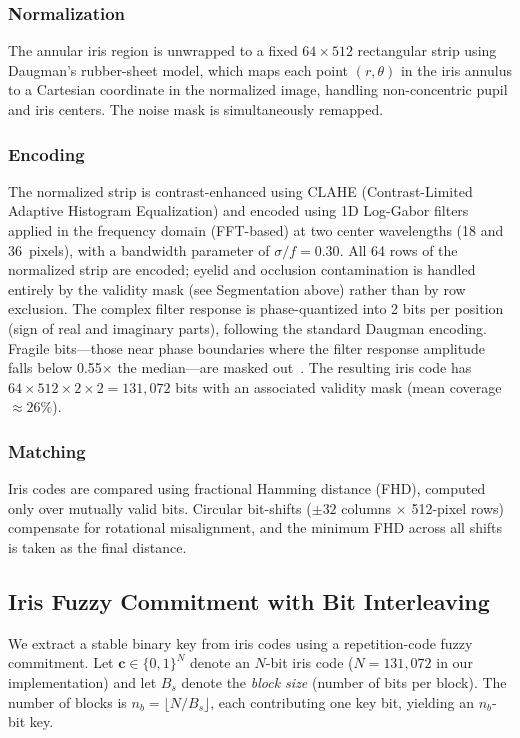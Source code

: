 \documentclass[3p,twocolumn]{elsarticle}
\begin{document}
\subsubsection{Normalization}
The annular iris region is unwrapped to a fixed $64 \times 512$ rectangular strip using Daugman's rubber-sheet model, which maps each point $(r, \theta)$ in the iris annulus to a Cartesian coordinate in the normalized image, handling non-concentric pupil and iris centers. The noise mask is simultaneously remapped.

\subsubsection{Encoding}
The normalized strip is contrast-enhanced using CLAHE (Contrast-Limited Adaptive Histogram Equalization) and encoded using 1D Log-Gabor filters applied in the frequency domain (FFT-based) at two center wavelengths (18 and 36~pixels), with a bandwidth parameter of $\sigma/f = 0.30$. All 64 rows of the normalized strip are encoded; eyelid and occlusion contamination is handled entirely by the validity mask (see Segmentation above) rather than by row exclusion. The complex filter response is phase-quantized into 2 bits per position (sign of real and imaginary parts), following the standard Daugman encoding. Fragile bits---those near phase boundaries where the filter response amplitude falls below 0.55$\times$ the median---are masked out~\cite{hollingsworth2009fragile}. The resulting iris code has $64 \times 512 \times 2 \times 2 = 131{,}072$ bits with an associated validity mask (mean coverage $\approx 26\%$).

\subsubsection{Matching}
Iris codes are compared using fractional Hamming distance (FHD), computed only over mutually valid bits. Circular bit-shifts ($\pm 32$ columns $\times$ 512-pixel rows) compensate for rotational misalignment, and the minimum FHD across all shifts is taken as the final distance. 

\subsection{Iris Fuzzy Commitment with Bit Interleaving}
\label{sec:iris_commitment}

We extract a stable binary key from iris codes using a repetition-code fuzzy commitment. Let $\mathbf{c} \in \{0,1\}^{N}$ denote an $N$-bit iris code ($N = 131{,}072$ in our implementation) and let $B_s$ denote the \emph{block size} (number of bits per block). The number of blocks is $n_b = \lfloor N / B_s \rfloor$, each contributing one key bit, yielding an $n_b$-bit key.
\end{document}
